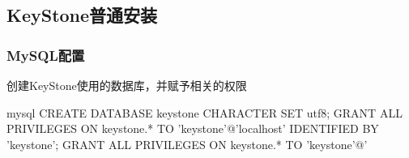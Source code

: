 \subsection{KeyStone普通安装}
\label{keystone_install}

\subsubsection{MySQL配置}

创建KeyStone使用的数据库，并赋予相关的权限
\begin{code-block}{mysql}
CREATE DATABASE keystone CHARACTER SET utf8;
GRANT ALL PRIVILEGES ON keystone.* TO 'keystone'@'localhost' IDENTIFIED BY 'keystone';
GRANT ALL PRIVILEGES ON keystone.* TO 'keystone'@'%
\end{code-block}

